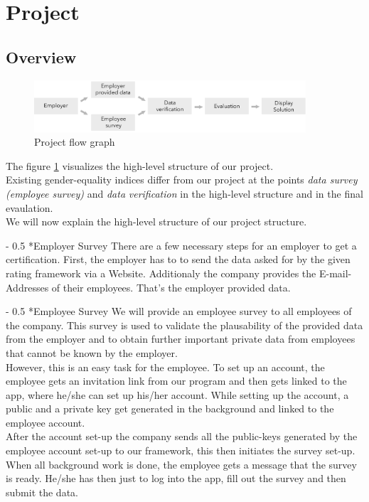 \documentclass[portrait,a4paper]{article}
\makeatletter
\renewcommand\paragraph{\@startsection{paragraph}{4}{0mm}%
	{-\baselineskip}%
	{0.5\baselineskip}%
	{\normalfont\bfseries}%
}%
\makeatother
\begin{document}
\section{Project}
	\subsection{Overview}
		\begin{figure}[H]
			\includegraphics[width=0.9\textwidth]{Bilder/bEquality-Overview}
			\caption{Project flow graph}
			\label{Project_flow_graph}
		\end{figure}

		The figure \ref{Project_flow_graph} visualizes the high-level structure of our project.\\
		Existing gender-equality indices differ from our project at the points 
		\textit{data survey (employee survey)} and \textit{data} \textit{verification} 
		in the high-level structure and in the final evaulation.\\
		We will now explain the high-level structure of our project structure.

		\paragraph*{Employer Survey}
			There are a few necessary steps for an employer to get a certification.
			First, the employer has to to send the data asked for by the given rating 
			framework via a Website. Additionaly the company provides the E-mail-Addresses 
			of their employees. That’s the employer provided data.

		\paragraph*{Employee Survey}
			We will provide an employee survey to all employees of the company. 
			This survey is used to validate the plausability of the 
			provided data from the employer and to obtain further important private data 
			from employees that cannot be known by the employer.\\

			However, this is an easy task for the employee. To set up an account, the employee 
			gets an invitation link from our program and then gets linked to the app, 
			where he/she can set up his/her account. While setting up the account, 
			a public and a private key get generated in the background and linked to the employee account.\\
			After the account set-up the company sends all the public-keys generated by the employee 
			account set-up to our framework, this then initiates the survey set-up.\\
			When all background work is done, the employee gets a message that the survey 
			is ready. He/she has then just to log into the app, fill out the survey and then submit the data.\\
\end{document}
